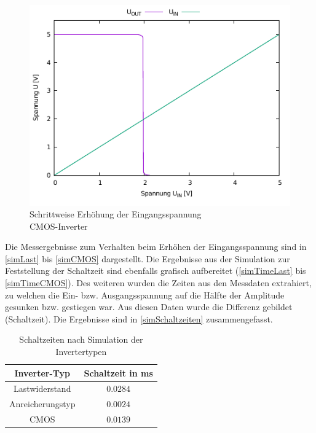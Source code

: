 \documentclass[11pt, a4paper]{article}
\begin{document}
\begin{figure}
    \centering
    \includegraphics[width=\linewidth]{simCMOS.pdf}
    \caption{Schrittweise Erhöhung der Eingangsspannung \\ CMOS-Inverter}
    \label{simCMOS}
\end{figure}
Die Messergebnisse zum Verhalten beim Erhöhen der Eingangsspannung sind in \autoref{simLast} bis \autoref{simCMOS} dargestellt. 
Die Ergebnisse aus der Simulation zur Feststellung der Schaltzeit sind ebenfalls grafisch aufbereitet (\autoref{simTimeLast}  bis \autoref{simTimeCMOS}). Des weiteren wurden die Zeiten aus den Messdaten extrahiert, zu welchen die Ein- bzw. Ausgangsspannung auf die Hälfte der Amplitude gesunken bzw. gestiegen war. Aus diesen Daten wurde die Differenz gebildet (Schaltzeit). Die Ergebnisse sind in \autoref{simSchaltzeiten} zusammengefasst.
\begin{table}[h]
\centering
\begin{tabular}{c|c}
Inverter-Typ & Schaltzeit in ms \\ \hline
Lastwiderstand & $0.0284$ \\
Anreicherungstyp & $0.0024$ \\
CMOS & $0.0139$
\end{tabular}
\caption{Schaltzeiten nach Simulation der Invertertypen}
\label{simSchaltzeiten}
\end{table}
\end{document}
